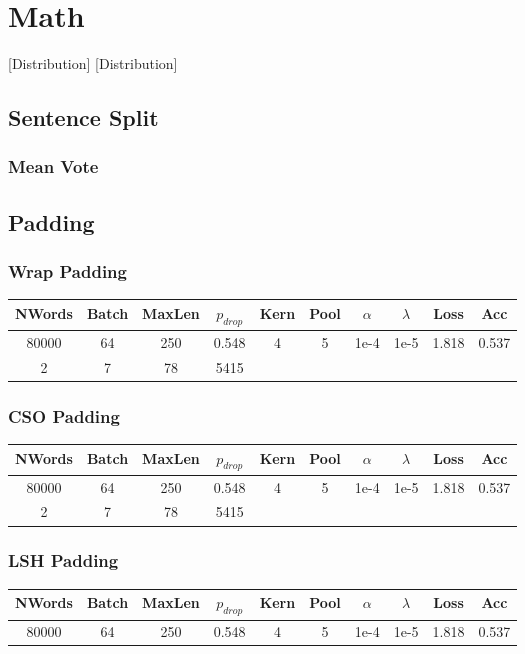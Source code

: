 \section{Math}
[Distribution]
[Distribution]
\subsection{Sentence Split}
\subsubsection{Mean Vote}

\subsection{Padding}
\subsubsection{Wrap Padding}
\begin{center}\begin{tabular}{||c c c c c c c c c c ||}
 \hline
 NWords & Batch & MaxLen & $p_{drop}$ & Kern & Pool & $\alpha$ & $\lambda$ &  Loss & Acc\\ [0.5ex]
 \hline\hline
 80000 & 64 & 250 & 0.548 & 4 & 5 & 1e-4 & 1e-5 & 1.818 & 0.537\\
 \hline
 2 & 7 & 78 & 5415 \\
 [1ex]\hline\end{tabular}\end{center}

\subsubsection{CSO Padding}
\begin{center}\begin{tabular}{||c c c c c c c c c c ||}
 \hline
 NWords & Batch & MaxLen & $p_{drop}$ & Kern & Pool & $\alpha$ & $\lambda$ &  Loss & Acc\\ [0.5ex]
 \hline\hline
 80000 & 64 & 250 & 0.548 & 4 & 5 & 1e-4 & 1e-5 & 1.818 & 0.537\\
 \hline
 2 & 7 & 78 & 5415 \\
 [1ex]\hline\end{tabular}\end{center}
\subsubsection{LSH Padding}
\begin{center}\begin{tabular}{||c c c c c c c c c c ||}
 \hline
 NWords & Batch & MaxLen & $p_{drop}$ & Kern & Pool & $\alpha$ & $\lambda$ &  Loss & Acc\\ [0.5ex]
 \hline\hline
 80000 & 64 & 250 & 0.548 & 4 & 5 & 1e-4 & 1e-5 & 1.818 & 0.537\\
 [1ex]\hline\end{tabular}\end{center}

